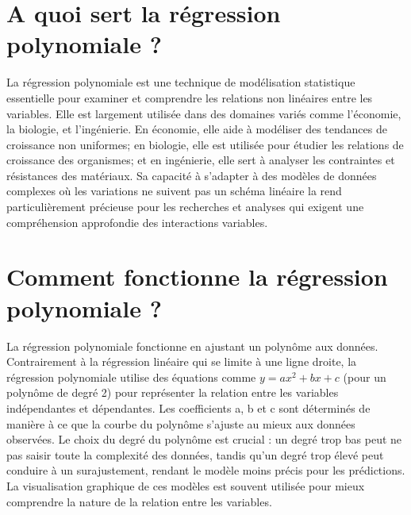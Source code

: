 \documentclass[a0,portrait]{a0poster}
\begin{document}




\color{SaddleBrown} %

\section*{A quoi sert la régression polynomiale ?}

La régression polynomiale est une technique de modélisation statistique essentielle pour examiner et comprendre les relations non linéaires entre les variables. Elle est largement utilisée dans des domaines variés comme l'économie, la biologie, et l'ingénierie. En économie, elle aide à modéliser des tendances de croissance non uniformes; en biologie, elle est utilisée pour étudier les relations de croissance des organismes; et en ingénierie, elle sert à analyser les contraintes et résistances des matériaux. Sa capacité à s'adapter à des modèles de données complexes où les variations ne suivent pas un schéma linéaire la rend particulièrement précieuse pour les recherches et analyses qui exigent une compréhension approfondie des interactions variables.

\color{DarkSlateGray} %

\section*{Comment fonctionne la régression polynomiale ?}

  La régression polynomiale fonctionne en ajustant un polynôme aux données. Contrairement à la régression linéaire qui se limite à une ligne droite, la régression polynomiale utilise des équations comme $y = ax^2 + bx + c$  (pour un polynôme de degré 2) pour représenter la relation entre les variables indépendantes et dépendantes. Les coefficients a, b et c sont déterminés de manière à ce que la courbe du polynôme s'ajuste au mieux aux données observées. Le choix du degré du polynôme est crucial : un degré trop bas peut ne pas saisir toute la complexité des données, tandis qu'un degré trop élevé peut conduire à un surajustement, rendant le modèle moins précis pour les prédictions. La visualisation graphique de ces modèles est souvent utilisée pour mieux comprendre la nature de la relation entre les variables.
\end{document}
